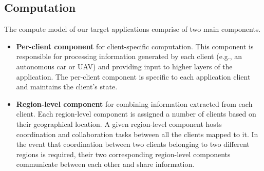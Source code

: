 \subsection{Computation}
\label{sec:app_model_compute}
The compute model of our target applications comprise of two main components.
\begin{itemize}
\item \textbf{Per-client component} for client-specific computation. This component is responsible for processing information generated by each client (e.g., an autonomous car or UAV) and providing input to higher layers of the application. The per-client component is specific to each application client and maintains the client's state.
\item \textbf{Region-level component} for combining information extracted from each client. Each region-level component is assigned a number of clients based on their geographical location. A given region-level component hosts  coordination and collaboration tasks between all the clients mapped to it. In the event that coordination between two clients belonging to two different regions is required, their two corresponding region-level components communicate between each other and share information.
\end{itemize}
